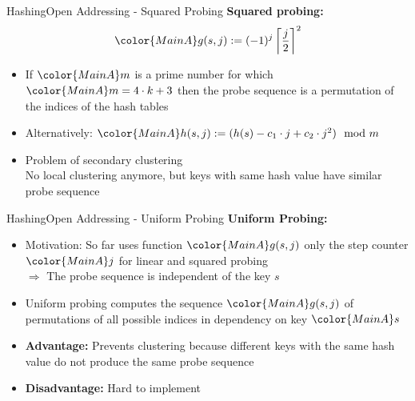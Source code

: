 
\begin{frame}{Hashing}{Open Addressing - Squared Probing}
  \textbf{Squared probing:}
  \begin{displaymath}
    {\color{MainA}g(s,j)
    := (-1)^j
    \left\lceil \frac{j}{2} \right\rceil^2}
  \end{displaymath}
  \vspace{-1.0em}
  \begin{itemize}
    \item<2->
      If ${\color{MainA}m}$ is a prime number for which
      \begin{math}
        {\color{MainA}m = 4 \cdot k + 3}
      \end{math}
      then the probe sequence is a permutation of the indices of
      the hash tables
   \item<3->
      Alternatively:
      \begin{math}
        {\color{MainA}h(s,j) := (h(s) - c_1 \cdot j + c_2 \cdot j^2) \mod m}
      \end{math}
    \item<4->
      Problem of secondary clustering\\
      No local clustering anymore, but keys with same hash value
      have similar probe sequence
  \end{itemize}
\end{frame}


\begin{frame}{Hashing}{Open Addressing - Uniform Probing}
  \textbf{Uniform Probing:}
  \begin{itemize}
    \item<2->
      Motivation: So far uses function ${\color{MainA}g(s,j)}$ only the step
      counter ${\color{MainA}j}$ for linear and squared probing\\
      {\color{red}$\Rightarrow$ The probe sequence is independent of the key
        $s$}
    \item<3->
      Uniform probing computes the sequence ${\color{MainA}g(s,j)}$ of permutations of all possible indices in dependency on key ${\color{MainA}s}$ 
    \item<4->
      \textbf{Advantage:}
      Prevents clustering because different keys with the same hash
      value do not produce the same probe sequence
    \item<5->
      \textbf{Disadvantage:}
      Hard to implement
  \end{itemize}
\end{frame}

